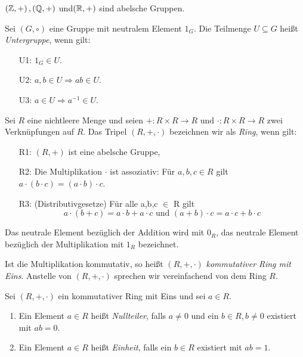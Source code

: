 %
\begin{bsp}
$\left( \mathbb{Z}, +\right), \left(\mathbb{Q}, +\right)$ und$\left(\mathbb{R}, +\right)$ sind abelsche Gruppen. 
\end{bsp}
%
\begin{defn}\label{Untergruppe}
Sei $\left(G, \circ\right)$ eine Gruppe mit neutralem Element $1_G$. Die Teilmenge $U\subseteq G$ heißt \textit{Untergruppe}, wenn gilt:
\begin{enumerate}
\item[U1: ] $1_G \in U$.
\item[U2: ] $a, b \in U \Rightarrow ab \in U$.
\item[U3: ] $a \in U \Rightarrow a^{-1} \in U$.
\end{enumerate} 
\end{defn}


\begin{defn}\label{Ring} %
Sei $R$ eine nichtleere Menge und seien $+ : R \times R \to R \text{ und } \cdot: R \times R \to R $ zwei Verknüpfungen auf $R$. Das Tripel $\left(R, +, \cdot\right)$ bezeichnen wir als \textit{Ring}, wenn gilt:
%
\begin{enumerate}
\item[R1: ] $(R, +)$ ist eine abelsche Gruppe,
\item[R2: ] Die Multiplikation $\cdot$ ist assoziativ: Für $a, b,c \in R$ gilt $a\cdot \left(b \cdot c\right) = \left(a \cdot b \right) \cdot c$.%
\item[R3: ] (Distributivgesetze) Für alle a,b,c $\in$ R gilt\\
\[a \cdot(b +c) = a \cdot b + a \cdot c \text{ und }
(a+b) \cdot c = a \cdot c + b \cdot c \] 
\end{enumerate}
\end{defn}
Das neutrale Element bezüglich der Addition wird mit \textbf{$0_R$}, das neutrale Element bezüglich der Multiplikation mit \textbf{$1_R$} bezeichnet.

\begin{bem} %
Ist die Multiplikation kommutativ, so heißt $\left(R, +, \cdot\right)$ \textit{kommutativer Ring mit Eins}. Anstelle von $\left(R, +, \cdot\right)$ sprechen wir vereinfachend von dem Ring $R$.
\end{bem}
%
\begin{defn}
Sei $\left(R, +, \cdot\right)$ ein kommutativer Ring mit Eins und sei $a \in R$.
\begin{enumerate}
\item Ein Element $a \in R$ heißt \textit{Nullteiler}, falls $a \neq 0$ und ein $b \in R, b \neq 0$ existiert mit $ab =0$.
\item Ein Element $a \in R$ heißt \textit{Einheit}, falls ein $b \in R$ existiert mit $ab = 1$. 
\end{enumerate}
\end{defn}

